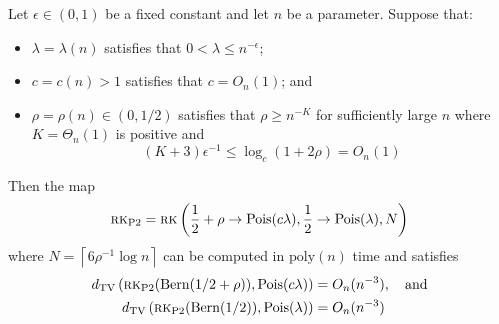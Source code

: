 \begin{lemma} \label{lem:5b}
Let $\epsilon \in (0, 1)$ be a fixed constant and let $n$ be a parameter. Suppose that:
\begin{itemize}
\item $\lambda = \lambda(n)$ satisfies that $0 < \lambda \le n^{-\epsilon}$;
\item $c = c(n) > 1$ satisfies that $c = O_n(1)$; and
\item $\rho = \rho(n) \in (0, 1/2)$ satisfies that $\rho \ge n^{-K}$ for sufficiently large $n$ where $K = \Theta_n(1)$ is positive and
$$(K + 3)\epsilon^{-1} \le \log_c (1 + 2\rho) = O_n(1)$$
\end{itemize}
Then the map
$$\textsc{rk}_{\text{P2}} = \textsc{rk}\left(\frac{1}{2} + \rho \to \text{Pois}(c\lambda), \frac{1}{2} \to \text{Pois}(\lambda), N \right)$$
where $N = \left\lceil 6\rho^{-1} \log n \right\rceil$ can be computed in $\text{poly}(n)$ time and satisfies
\begin{align*}
d_{\text{TV}}\left(\textsc{rk}_{\text{P2}}(\text{Bern}(1/2 + \rho)), \text{Pois}(c\lambda) \right) &= O_n(n^{-3}), \quad \text{and} \\
d_{\text{TV}}\left(\textsc{rk}_{\text{P2}}(\text{Bern}(1/2)), \text{Pois}(\lambda) \right) &= O_n(n^{-3})
\end{align*}
\end{lemma}

